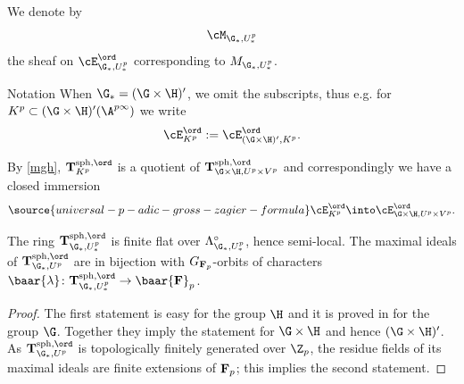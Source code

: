   We denote by
  $$\cM_{\G_{*}, U^{p}_{*}}$$
  the sheaf on $ \cE^{\ord}_{\G_{*}, U_{*}^{p}}$ corresponding to $M_{\G_{*}, U^{p}_{*}}$.
\begin{enonce*}{Notation} \textup{When $\G_{*}= (\G\times \H)'$, we omit the subscripts, thus e.g. for $K^{p}\subset  (\G\times \H)'(\A^{p\infty})$
we write
  $$\cE_{K^{p}}^{\ord}:= \cE_{(\G\times \H)', K^{p}}^{\ord}.$$}
\end{enonce*}



By \eqref{mgh},
  ${\bf T}_{K^{p}}^{{\rm sph}, \ord}$ is a quotient of ${\bf T}_{\G\times \H, U^{p}\times V^{p}}^{{\rm sph}, \ord}$ and correspondingly we have a closed immersion
\begin{align}\label{immers}
\source{universal-p-adic-gross-zagier-formula}
\cE_{K^{p}}^{\ord}\into \cE_{\G\times\H, U^{p}\times V^{p}}^{\ord}.
\end{align}




\begin{prop}
\notready\label{semi-local}
The ring $ {\bf T}_{\G_{*}, U^{p}_{*} }^{{\rm sph}, \ord}$ is finite  flat
 over $\Lambda^{\circ}_{\G_{*}, U^{p}_{*}}$, hence semi-local.
  The  maximal ideals of $ {\bf T}_{\G_{*}, U^{p}}^{{\rm sph}, \ord} $ are in bijection with $G_{{\bf F}_{p}}$-orbits of  characters $\baar{\lambda}\colon
 {\bf T}_{\G_{*}, U^{p}_{*}}^{{\rm sph}, \ord}\to \baar{\bf F}_{p}$.
  \end{prop}
 \begin{proof}
The first statement is easy for the group $\H$ and it is  proved in \cite{hida-luminy} for the group $\G$. Together they imply the statement for $\G\times \H$ and hence $(\G\times \H)'$.
As  $ {\bf T}_{\G_{*}, U^{p}}^{{\rm sph}, \ord} $  is topologically finitely generated over $\Z_{p}$, the residue fields of its maximal ideals are finite extensions of ${\bf F}_{p}$; this implies the second statement.
\end{proof}


